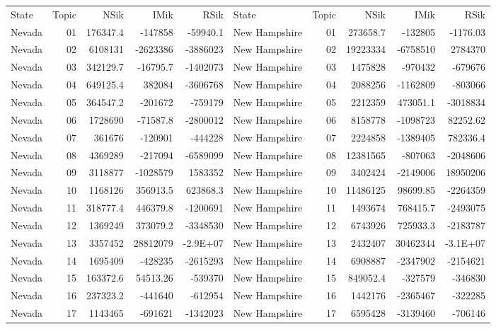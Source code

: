 \begin{table}[]
	\footnotesize
	\begin{tabular}{lrrrrlrrrr}
	State & Topic & NSik & IMik & RSik & State & Topic & NSik & IMik & RSik \\
		Nevada &  01  & 176347.4 & -147858 & -59940.1 & New Hampshire &  01  & 273658.7 & -132805 & -1176.03 \\
		Nevada &  02  & 6108131 & -2623386 & -3886023 & New Hampshire &  02  & 19223334 & -6758510 & 2784370 \\
		Nevada &  03  & 342129.7 & -16795.7 & -1402073 & New Hampshire &  03  & 1475828 & -970432 & -679676 \\
		Nevada &  04  & 649125.4 & 382084 & -3606768 & New Hampshire &  04  & 2088256 & -1162809 & -803066 \\
		Nevada &  05  & 364547.2 & -201672 & -759179 & New Hampshire &  05  & 2212359 & 473051.1 & -3018834 \\
		Nevada &  06  & 1728690 & -71587.8 & -2800012 & New Hampshire &  06  & 8158778 & -1098723 & 82252.62 \\
		Nevada &  07  & 361676 & -120901 & -444228 & New Hampshire &  07  & 2224858 & -1389405 & 782336.4 \\
		Nevada &  08  & 4369289 & -217094 & -6589099 & New Hampshire &  08  & 12381565 & -807063 & -2048606 \\
		Nevada &  09  & 3118877 & -1028579 & 1583352 & New Hampshire &  09  & 3402424 & -2149006 & 18950206 \\
		Nevada &  10 & 1168126 & 356913.5 & 623868.3 & New Hampshire &  10 & 11486125 & 98699.85 & -2264359 \\
		Nevada &  11 & 318777.4 & 446379.8 & -1200691 & New Hampshire &  11 & 1493674 & 768415.7 & -2493075 \\
		Nevada &  12 & 1369249 & 373079.2 & -3348530 & New Hampshire &  12 & 6743926 & 725933.3 & -2183787 \\
		Nevada &  13 & 3357452 & 28812079 & -2.9E+07 & New Hampshire &  13 & 2432407 & 30462344 & -3.1E+07 \\
		Nevada &  14 & 1695409 & -428235 & -2615293 & New Hampshire &  14 & 6908887 & -2347902 & -2154621 \\
		Nevada &  15 & 163372.6 & 54513.26 & -539370 & New Hampshire &  15 & 849052.4 & -327579 & -346830 \\
		Nevada &  16 & 237323.2 & -441640 & -612954 & New Hampshire &  16 & 1442176 & -2365467 & -322285 \\
		Nevada &  17 & 1143465 & -691621 & -1342023 & New Hampshire &  17 & 6595428 & -3139460 & -706146 \\

\end{tabular}
\end{table}
